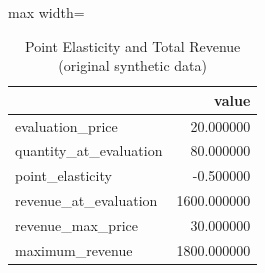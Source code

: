 \begin{table}[htbp]
\centering
\caption{Point Elasticity and Total Revenue (original synthetic data)}
\begingroup
\small
\setlength{\tabcolsep}{6pt}
\renewcommand{\arraystretch}{1.12}
\begin{adjustbox}{max width=\linewidth}
\begin{tabular}{@{}lr@{}}
\toprule
 & value \\
\midrule
evaluation\_price & 20.000000 \\
quantity\_at\_evaluation & 80.000000 \\
point\_elasticity & -0.500000 \\
revenue\_at\_evaluation & 1600.000000 \\
revenue\_max\_price & 30.000000 \\
maximum\_revenue & 1800.000000 \\
\bottomrule
\end{tabular}
\end{adjustbox}
\endgroup
\end{table}
